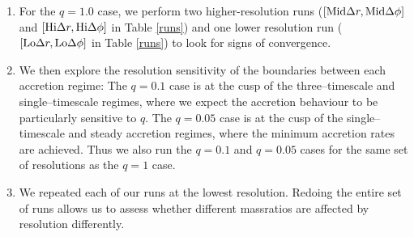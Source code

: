 \begin{enumerate}
%
\item For the $q=1.0$ case, we perform two higher-resolution
  runs ($\left[ \hbox{Mid} \Delta r, \hbox{Mid}\Delta \phi \right]$
  and $\left[ \hbox{Hi} \Delta r, \hbox{Hi} \Delta \phi \right]$ in
  Table \ref{runs}) and one lower resolution run ($\left[ \hbox{Lo}
    \Delta r, \hbox{Lo} \Delta \phi \right]$ in Table \ref{runs}) to
  look for signs of convergence.
%
\item We then explore the resolution sensitivity of the boundaries between each accretion regime: The $q=0.1$ case is at the cusp of
  the three--timescale and single--timescale regimes, where we expect the
  accretion behaviour to be particularly sensitive to $q$. The $q=0.05$ case is at the cusp of
  the single--timescale and steady accretion regimes, where the
  minimum accretion rates are achieved. Thus we also run the $q=0.1$ and $q=0.05$ cases for the same set of resolutions as the $q=1$ case. 
\item We repeated each of our runs at the lowest resolution.  Redoing
  the entire set of runs allows us to assess whether different massratios
  are affected by resolution differently.  
\end{enumerate}


